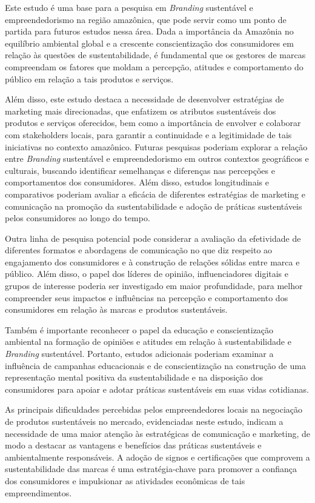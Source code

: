 Este estudo é uma base para a pesquisa em \textit{Branding} sustentável e empreendedorismo na região amazônica, que pode servir como um ponto de partida para futuros estudos nessa área. Dada a importância da Amazônia no equilíbrio ambiental global e a crescente conscientização dos consumidores em relação às questões de sustentabilidade, é fundamental que os gestores de marcas compreendam os fatores que moldam a percepção, atitudes e comportamento do público em relação a tais produtos e serviços.

Além disso, este estudo destaca a necessidade de desenvolver estratégias de marketing mais direcionadas, que enfatizem os atributos sustentáveis dos produtos e serviços oferecidos, bem como a importância de envolver e colaborar com stakeholders locais, para garantir a continuidade e a legitimidade de tais iniciativas no contexto amazônico.
Futuras pesquisas poderiam explorar a relação entre \textit{Branding} sustentável e empreendedorismo em outros contextos geográficos e culturais, buscando identificar semelhanças e diferenças nas percepções e comportamentos dos consumidores. Além disso, estudos longitudinais e comparativos poderiam avaliar a eficácia de diferentes estratégias de marketing e comunicação na promoção da sustentabilidade e adoção de práticas sustentáveis pelos consumidores ao longo do tempo.

Outra linha de pesquisa potencial pode considerar a avaliação da efetividade de diferentes formatos e abordagens de comunicação no que diz respeito ao engajamento dos consumidores e à construção de relações sólidas entre marca e público. Além disso, o papel dos líderes de opinião, influenciadores digitais e grupos de interesse poderia ser investigado em maior profundidade, para melhor compreender seus impactos e influências na percepção e comportamento dos consumidores em relação às marcas e produtos sustentáveis.

Também é importante reconhecer o papel da educação e conscientização ambiental na formação de opiniões e atitudes em relação à sustentabilidade e \textit{Branding} sustentável. Portanto, estudos adicionais poderiam examinar a influência de campanhas educacionais e de conscientização na construção de uma representação mental positiva da sustentabilidade e na disposição dos consumidores para apoiar e adotar práticas sustentáveis em suas vidas cotidianas.

As principais dificuldades percebidas pelos empreendedores locais na negociação de produtos sustentáveis no mercado, evidenciadas neste estudo, indicam a necessidade de uma maior atenção às estratégicas de comunicação e marketing, de modo a destacar as vantagens e benefícios das práticas sustentáveis e ambientalmente responsáveis. A adoção de signos e certificações que comprovem a sustentabilidade das marcas é uma estratégia-chave para promover a confiança dos consumidores e impulsionar as atividades econômicas de tais empreendimentos.

